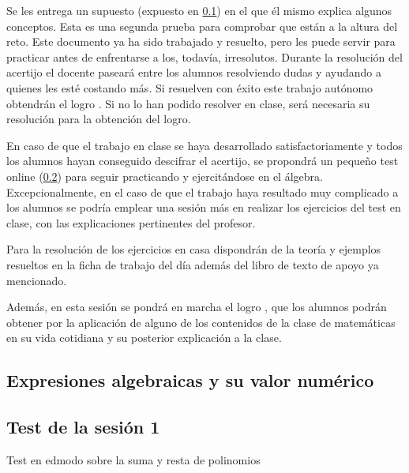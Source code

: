 Se les entrega un supuesto  (expuesto en \ref{app:DocModel}) en el que él mismo explica algunos conceptos.
%
Esta es una segunda prueba para comprobar que están a la altura del reto.
%
Este documento ya ha sido trabajado y resuelto, pero les puede servir para practicar antes de enfrentarse a los, todavía, irresolutos.
%
Durante la resolución del acertijo el docente paseará entre los alumnos resolviendo dudas y ayudando a quienes les esté costando más. 
%
Si resuelven con éxito este trabajo autónomo obtendrán el logro .
%
Si no lo han podido resolver en clase, será necesaria su resolución para la obtención del logro.

En caso de que el trabajo en clase se haya desarrollado satisfactoriamente y todos los alumnos hayan conseguido descifrar el acertijo, se propondrá un pequeño test online (\ref{test:ses1}) para seguir practicando y ejercitándose en el álgebra.
%
Excepcionalmente, en el caso de que el trabajo haya resultado muy complicado a los alumnos se podría emplear una sesión más en realizar los ejercicios del test en clase, con las explicaciones pertinentes del profesor.

Para la resolución de los ejercicios en casa dispondrán de la teoría y ejemplos resueltos en la ficha de trabajo del día además del libro de texto de apoyo ya mencionado.

Además, en esta sesión se pondrá en marcha el logro , que los alumnos podrán obtener por la aplicación de alguno de los contenidos de la clase de matemáticas en su vida cotidiana y su posterior explicación a la clase.

\subsection{Expresiones algebraicas y su valor numérico}
\label{app:DocModel}



\subsection{Test de la sesión 1}
\label{test:ses1}

Test en edmodo sobre la suma y resta de polinomios






